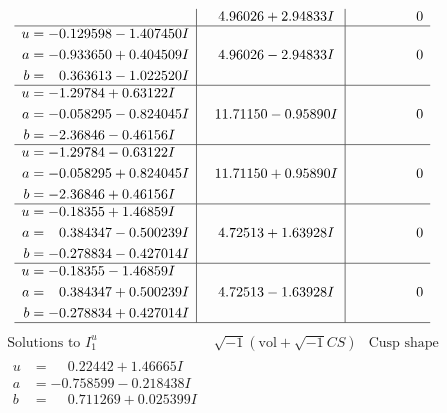 \documentclass[1p]{elsarticle_modified}
\theoremstyle{definition}
\newcommand{\I}{\sqrt{-1}}
\begin{document}
$$\begin{array}{c|c|c}
 & \phantom{-}4.96026 + 2.94833 I & \phantom{-0.000000 } 0 \\ \hline\begin{aligned}
u &= -0.129598 - 1.407450 I \\
a &= -0.933650 + 0.404509 I \\
b &= \phantom{-}0.363613 - 1.022520 I\end{aligned}
 & \phantom{-}4.96026 - 2.94833 I & \phantom{-0.000000 } 0 \\ \hline\begin{aligned}
u &= -1.29784 + 0.63122 I \\
a &= -0.058295 - 0.824045 I \\
b &= -2.36846 - 0.46156 I\end{aligned}
 & \phantom{-}11.71150 - 0.95890 I & \phantom{-0.000000 } 0 \\ \hline\begin{aligned}
u &= -1.29784 - 0.63122 I \\
a &= -0.058295 + 0.824045 I \\
b &= -2.36846 + 0.46156 I\end{aligned}
 & \phantom{-}11.71150 + 0.95890 I & \phantom{-0.000000 } 0 \\ \hline\begin{aligned}
u &= -0.18355 + 1.46859 I \\
a &= \phantom{-}0.384347 - 0.500239 I \\
b &= -0.278834 - 0.427014 I\end{aligned}
 & \phantom{-}4.72513 + 1.63928 I & \phantom{-0.000000 } 0 \\ \hline\begin{aligned}
u &= -0.18355 - 1.46859 I \\
a &= \phantom{-}0.384347 + 0.500239 I \\
b &= -0.278834 + 0.427014 I\end{aligned}
 & \phantom{-}4.72513 - 1.63928 I & \phantom{-0.000000 } 0\\
 \hline 
 \end{array}$$\newpage$$\begin{array}{c|c|c}  
\text{Solutions to }I^u_{1}& \I (\text{vol} + \sqrt{-1}CS) & \text{Cusp shape}\\
 \hline 
\begin{aligned}
u &= \phantom{-}0.22442 + 1.46665 I \\
a &= -0.758599 - 0.218438 I \\
b &= \phantom{-}0.711269 + 0.025399 I\end{aligned}

\end{array}$$
\end{document}
